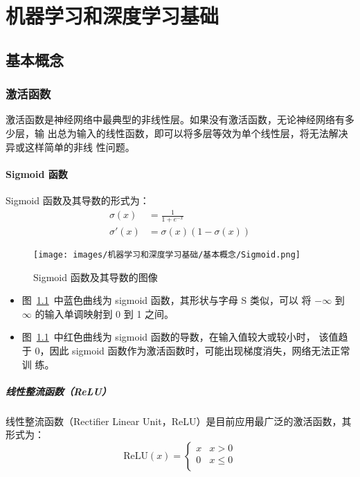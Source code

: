 \part{机器学习和深度学习基础}

\chapter{基本概念}

\section{激活函数}

激活函数是神经网络中最典型的非线性层。如果没有激活函数，无论神经网络有多少层，输
出总为输入的线性函数，即可以将多层等效为单个线性层，将无法解决异或这样简单的非线
性问题。

\subsection{Sigmoid 函数}\label{subsec:Sigmoid}

Sigmoid 函数及其导数的形式为：
\begin{align}
  \label{equ:sigmoid}
  \sigma(x) & = \frac{1}{1 + e^{-x}} \\
  \label{equ:sigmoid-d}
  \sigma'(x) & = \sigma(x) (1-\sigma(x))
\end{align}

\begin{figure}[ht]
  \centering
  \texttt{[image: images/机器学习和深度学习基础/基本概念/Sigmoid.png]}
  \caption{Sigmoid 函数及其导数的图像}\label{fig:sigmoid}
\end{figure}

\begin{itemize}
  \item 图~\ref{fig:sigmoid}~中蓝色曲线为 sigmoid 函数，其形状与字母 S 类似，可以
    将 $-\infty$ 到 $\infty$ 的输入单调映射到 0 到 1 之间。
  \item 图~\ref{fig:sigmoid}~中红色曲线为 sigmoid 函数的导数，在输入值较大或较小时，
    该值趋于 0，因此 sigmoid 函数作为激活函数时，可能出现梯度消失，网络无法正常训
    练。
\end{itemize}

\subsubsection{线性整流函数（ReLU）}

线性整流函数（Rectifier Linear Unit，ReLU）是目前应用最广泛的激活函数，其形式为：
\begin{equation}
  \label{equ:ReLU}
  \mathrm{ReLU}(x) = \left\{
    \begin{array}{lr}
      x & x > 0 \\
      0 & x \leq 0 \\
    \end{array}
  \right.
\end{equation}

